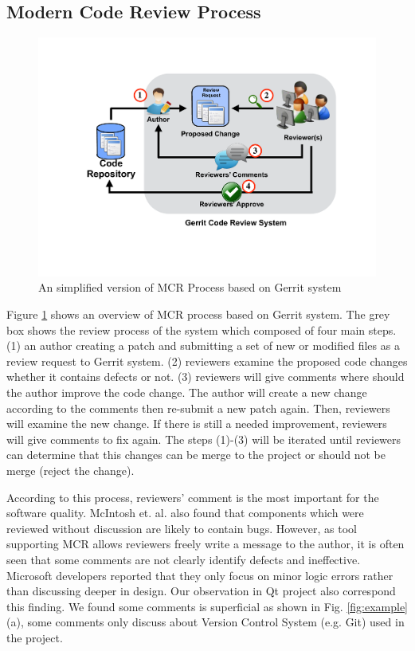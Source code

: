 \documentclass[conference]{IEEEtran}
\begin{document}
\subsection{Modern Code Review Process}
\begin{figure}[!t]
\centering
\includegraphics[scale=0.35, trim= 100 110 50 80, clip=true]{review_process}
\caption{An simplified version of MCR Process based on Gerrit system}
\label{fig:process}
\end{figure}
Figure \ref{fig:process} shows an overview of MCR process based on Gerrit system. The grey box shows the review process of the system which composed of four main steps. (1) an author creating a patch and submitting a set of new or modified files as a review request to Gerrit system. (2) reviewers examine the proposed code changes whether it contains defects or not. (3) reviewers will give comments where should the author improve the code change. The author will create a new change according to the comments then re-submit a new patch again. Then, reviewers will examine the new change. If there is still a needed improvement, reviewers will give comments to fix again. The steps (1)-(3) will be iterated until reviewers can determine that this changes can be merge to the project or should not be merge (reject the change). 

According to this process, reviewers' comment is the most important for the software quality. McIntosh et. al. \cite{Mcintosh} also found that components which were reviewed without discussion are likely to contain bugs. However, as tool supporting MCR allows reviewers freely write a message to the author, it is often seen that some comments are not clearly identify defects and ineffective. Microsoft developers reported that they only focus on minor logic errors rather than discussing deeper in design\cite{Bacchelli2013a}. Our observation in Qt project also correspond this finding. We found some comments is superficial as shown in Fig. \ref{fig:example}(a), some comments only discuss about Version Control System (e.g. Git) used in the project. 
\end{document}

